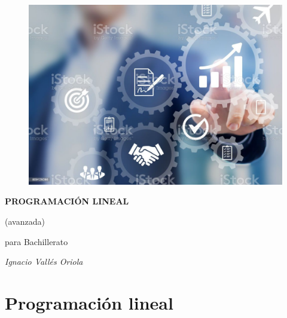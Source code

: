 \chapter*{}

\vspace{-3cm}
\begin{figure}[H]
	\centering
	\includegraphics[width=.75\textwidth]{imagenes/img03.png}
\end{figure}

\vspace{4cm}
\begin{center}

\huge{\textbf{PROGRAMACIÓN LINEAL}} 

\Large{(avanzada)}

\huge{para Bachillerato}

\vspace{2cm}
\begin{flushright}
	\normalsize{\emph{Ignacio Vallés Oriola}}
\end{flushright}


\end{center}






\chapter{Programación lineal}

	
